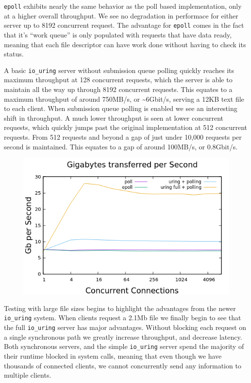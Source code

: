 \documentclass[letterpaper, 10pt, twocolumn]{article}
\begin{document}
\texttt{epoll} exhibits nearly the same behavior as the poll based implementation, only at a higher overall throughput. We see no degradation in performace for either server up to 8192 concurrent request. The advantage for \texttt{epoll} comes in the fact that it's ``work queue'' is only populated with requests that have data ready, meaning that each file descriptor can have work done without having to check its status.

A basic \texttt{io\_uring} server without submission queue polling quickly reaches its maximum throughput at 128 concurrent requests, which the server is able to maintain all the way up through 8192 concurrent requests. This equates to a maximum throughput of around 750MB/s, or \textasciitilde{}6Gbit/s, serving a 12KB text file to each client. When submission queue polling is enabled we see an interesting shift in throughput. A much lower throughput is seen at lower concurrent requests, which quickly jumps past the original implementation at 512 concurrent requests. From 512 requests and beyond a gap of just under 10,000 requests per second is maintained. This equates to a gap of around 100MB/s, or 0.8Gbit/s.

\begin{figure}
\centering
\includegraphics[width=4.5in]{gbps.png}
\end{figure}

Testing with large file sizes begins to highlight the advantages from the newer \texttt{io\_uring} system. When clients request a 2.1Mb file we finally begin to see that the full \texttt{io\_uring} server has major advantages. Without blocking each request on a single synchronous path we greatly increase throughput, and decrease latency. Both synchronous servers, and the simple \texttt{io\_uring} server spend the majority of their runtime blocked in system calls, meaning that even though we have thousands of connected clients, we cannot concurrently send any information to multiple clients.
\end{document}

